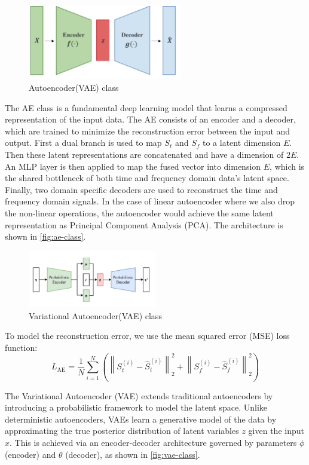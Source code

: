 \documentclass[12pt]{article}
\begin{document}
\begin{figure}[htbp]
    \centering
    \includegraphics[width=0.6\textwidth]{ae-class.png}
    \caption{Autoencoder(VAE) class}
    \label{fig:ae-class}
\end{figure}

The AE class is a fundamental deep learning model that learns a compressed representation of the input data. The AE consists of an encoder and a decoder, which are trained to minimize the reconstruction error between the input and output.  First a dual branch is used to map $S_t$ and $S_f$ to a latent dimension $E$. Then these latent representations are concatenated and have a dimension of $2E$. An MLP layer is then applied to map the fused vector into dimension $E$, which is the shared bottleneck of both time and frequency domain data's latent space. Finally, two domain specific decoders are used to reconstruct the time and frequency domain signals. In the case of linear autoencoder where we also drop the non-linear operations, the autoencoder would achieve the same latent representation as Principal Component Analysis (PCA). The architecture is shown in \autoref{fig:ae-class}.

\begin{figure}[htbp]
    \centering
    \includegraphics[width=0.5\textwidth]{vae-class.png}
    \caption{Variational Autoencoder(VAE) class}
    \label{fig:vae-class}
\end{figure}


To model the reconstruction error, we use the mean squared error (MSE) loss function:
$$
    L_{\text{AE}} = \frac{1}{N} \sum_{i=1}^{N} \left( \left\| S_{t}^{(i)} - \hat{S}_{t}^{(i)} \right\|_{2}^{2} + \left\| S_{f}^{(i)} - \hat{S}_{f}^{(i)} \right\|_{2}^{2} \right)
$$


The Variational Autoencoder (VAE) extends traditional autoencoders by introducing a probabilistic framework to model the latent space. Unlike deterministic autoencoders, VAEs learn a generative model of the data by approximating the true posterior distribution of latent variables $z$ given the input $x$. This is achieved via an encoder-decoder architecture governed by parameters $\phi$(encoder) and $\theta$ (decoder), as shown in \autoref{fig:vae-class}.
\end{document}

